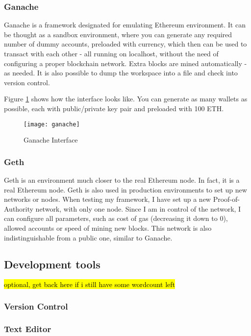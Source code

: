 \subsubsection{Ganache}
Ganache\cite{lee2019testing} is a framework designated for emulating Ethereum environment. It can be thought as a sandbox environment, where you can generate any required number of dummy accounts, preloaded with currency, which then can be used to transact with each other - all running on localhost, without the need of configuring a proper blockchain network. Extra blocks are mined automatically - as needed. It is also possible to dump the workspace into a file and check into version control.

Figure \ref{fig:ganache} shows how the interface looks like. You can generate as many wallets as possible, each with public/private key pair and preloaded with 100 ETH.
\begin{figure}[h]
    \centering
    \texttt{[image: ganache]}
    \caption{Ganache Interface}
    \label{fig:ganache}
\end{figure}

\subsubsection{Geth}
Geth is an environment much closer to the real Ethereum node. In fact, it is a real Ethereum node. Geth is also used in production environments to set up new networks or nodes. When testing my framework, I have set up a new Proof-of-Authority network, with only one node. Since I am in control of the network, I can configure all parameters, such as cost of gas (decreasing it down to 0), allowed accounts or speed of mining new blocks. This network is also indistinguishable from a public one, similar to Ganache.
\subsection{Development tools}
\hl{optional, get back here if i still have some wordcount left}
\subsubsection{Version Control}
\subsubsection{Text Editor}


